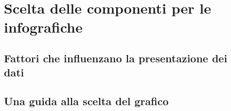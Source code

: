\chapter{Scelta delle componenti per le infografiche}
\label{cap:scelta}

\section{Fattori che influenzano la presentazione dei dati}

\section{Una guida alla scelta del grafico}

